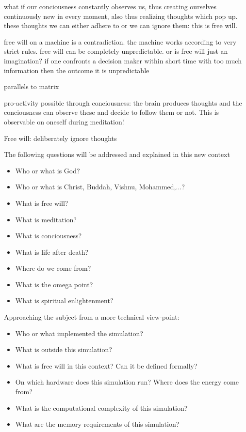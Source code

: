 \documentclass[twocolumn]{article}
\begin{document}
what if our conciousness constantly observes us, thus creating ourselves continuously new in every moment, also thus realizing thoughts which pop up. these thoughts we can either adhere to or we can ignore them: this is free will.

free will on a machine is a contradiction. the machine works according to very strict rules. free will can be completely unpredictable. or is free will just an imagination? if one confronts a decision maker within short time with too much information then the outcome it is unpredictable 

parallels to matrix

pro-activity possible through conciousness: the brain produces thoughts and the conciousness can observe these and decide to follow them or not. This is observable on oneself during meditation!

Free will: deliberately ignore thoughts

The following questions will be addressed and explained in this new context

\begin{itemize}
\item Who or what is God?
\item Who or what is Christ, Buddah, Vishnu, Mohammed,...?
\item What is free will? 
\item What is meditation?
\item What is conciousness?
\item What is life after death?
\item Where do we come from?
\item What is the omega point?
\item What is spiritual enlightenment?
\end{itemize}

Approaching the subject from a more technical view-point:

\begin{itemize}
\item Who or what implemented the simulation?
\item What is outside this simulation?
\item What is free will in this context? Can it be defined formally?
\item On which hardware does this simulation run? Where does the energy come from?
\item What is the computational complexity of this simulation?
\item What are the memory-requirements of this simulation?
\end{itemize}
\end{document}
